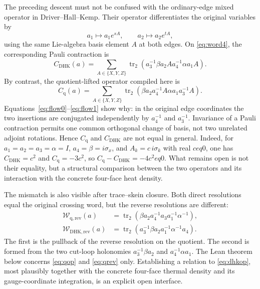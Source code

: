 \documentclass[11pt]{article}
\theoremstyle{definition}
\newcommand{\trn}{\operatorname{tr}_2}
\newcommand{\W}{\mathcal W}
\begin{document}
The preceding descent must not be confused with the ordinary-edge mixed
operator in Driver--Hall--Kemp.  Their operator differentiates the original
variables by
\[
 a_1\longmapsto a_1e^{sA},\qquad
 a_2\longmapsto a_2e^{tA},
\]
using the same Lie-algebra basis element $A$ at both edges.  On
\eqref{eq:word4}, the corresponding Pauli contraction is
\begin{equation}\label{eq:dhkop}
 C_{\mathrm{DHK}}(a)=\sum_{A\in\{X,Y,Z\}}
 \trn\!\left(a_3^{-1}\beta a_2 A
              a_4^{-1}\alpha a_1 A\right).
\end{equation}
By contrast, the quotient-lifted operator compiled here is
\begin{equation}\label{eq:qop}
 C_{\mathrm q}(a)=\sum_{A\in\{X,Y,Z\}}
 \trn\!\left(\beta a_2a_4^{-1}A
              \alpha a_1a_3^{-1}A\right).
\end{equation}
Equations~\eqref{eq:flow0}--\eqref{eq:flow1} show why: in the original edge
coordinates the two insertions are conjugated independently by $a_4^{-1}$
and $a_3^{-1}$.  Invariance of a Pauli contraction permits one common
orthogonal change of basis, not two unrelated adjoint rotations.  Hence
$C_{\mathrm q}$ and $C_{\mathrm{DHK}}$ are not equal in general.  Indeed, for
$a_1=a_2=a_3=\alpha=I$, $a_4=\beta=i\sigma_x$, and $A_k=c\,i\sigma_k$ with real
$c
eq0$, one has $C_{\mathrm{DHK}}=c^{2}$ and $C_{\mathrm q}=-3c^{2}$, so
$C_{\mathrm q}-C_{\mathrm{DHK}}=-4c^{2}
eq0$.  What remains open is not their
equality, but a structural comparison between the two operators and its
interaction with the concrete four-face heat density.

The mismatch is also visible after trace--skein closure.  Both direct
resolutions equal the original crossing word, but the reverse resolutions
are different:
\begin{align}
 \W_{\mathrm{q,rev}}(a)
 &=\trn\!\left(\beta a_2a_4^{-1}a_3a_1^{-1}\alpha^{-1}\right),
 \label{eq:qrev}\\
 \W_{\mathrm{DHK,rev}}(a)
 &=\trn\!\left(a_3^{-1}\beta a_2a_1^{-1}\alpha^{-1}a_4\right).
 \label{eq:dhkrev}
\end{align}
The first is the pullback of the reverse resolution on the quotient.  The
second is formed from the two cut-loop holonomies
$a_3^{-1}\beta a_2$ and $a_4^{-1}\alpha a_1$.  The Lean theorem below concerns
\eqref{eq:qop} and \eqref{eq:qrev} only.  Establishing a relation to
\eqref{eq:dhkop}, most plausibly together with the concrete four-face thermal
density and its gauge-coordinate integration, is an explicit open interface.
\end{document}
